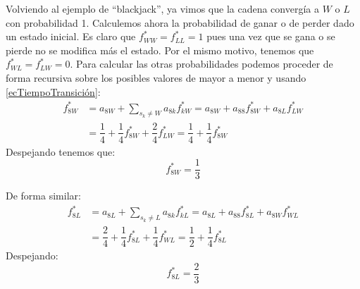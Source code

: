 \begin{exampleth}
Volviendo al ejemplo de \enquote{blackjack}, ya vimos que la cadena convergía a $W$ o $L$ con probabilidad 1. Calculemos ahora la probabilidad de ganar o de perder dado un estado inicial. Es claro que $f_{WW}^*=f_{LL}^*=1$ pues una vez que se gana o se pierde no se modifica más el estado. Por el mismo motivo, tenemos que $f_{WL}^*=f_{LW}^*=0$. Para calcular las otras probabilidades podemos proceder de forma recursiva sobre los posibles valores de mayor a menor y usando \eqref{ecTiempoTransición}:
\[
    \begin{aligned}
        f_{8W}^*&=a_{8W}+\sum_{s_k\neq W}a_{8k}f_{kW}^*=a_{8W}+a_{88}f_{8W}^*+a_{8L}f_{LW}^*\\
        &=\dfrac{1}{4}+\dfrac{1}{4}f_{8W}^*+\dfrac{2}{4}f_{LW}^*=\dfrac{1}{4}+\dfrac{1}{4}f_{8W}^*
    \end{aligned}
        \]
Despejando tenemos que:
\[f_{8W}^*=\dfrac{1}{3}\]

De forma similar:
\[
\begin{aligned}
    f_{8L}^*&=a_{8L}+\sum_{s_k\neq L}a_{8k}f_{kL}^*=a_{8L}+a_{88}f_{8L}^*+a_{8W}f_{WL}^*\\
    &=\dfrac{2}{4}+\dfrac{1}{4}f_{8L}^*+\dfrac{1}{4}f_{WL}^*=\dfrac{1}{2}+\dfrac{1}{4}f_{8L}^*
\end{aligned}    
\]
Despejando:
\[f_{8L}^*=\dfrac{2}{3}\]


\end{exampleth}
